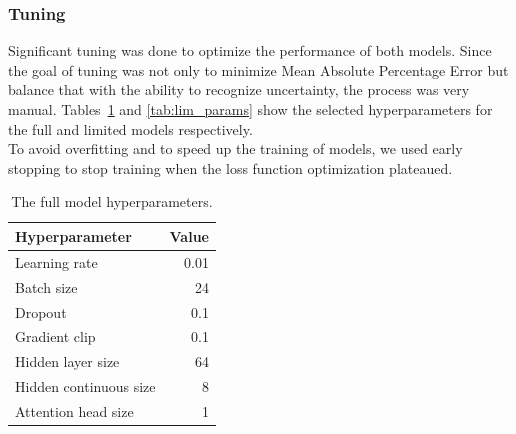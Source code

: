     \pagebreak
    \subsubsection{Tuning}
        Significant tuning was done to optimize the performance of both models. Since the goal of tuning was not only to minimize Mean Absolute Percentage Error but balance that with the ability to recognize uncertainty, the process was very manual. Tables~\ref{tab:full_params} and \ref{tab:lim_params} show the selected hyperparameters for the full and limited models respectively.\\
        
        To avoid overfitting and to speed up the training of models, we used early stopping to stop training when the loss function optimization plateaued. 
        
        \vspace{1.5cm}
    
        \begin{table}[ht!]
        \begin{center}
        \caption{The full model hyperparameters.
        \label{tab:full_params}}
        \vspace{0.5cm}
        \begin{tabular}{|l|r|}
        \hline
        \textbf{Hyperparameter} & \textbf{Value} \\ \hline
        Learning rate            & 0.01         \\ \hline
        Batch size              & 24            \\ \hline
        Dropout                 & 0.1            \\ \hline
        Gradient clip           & 0.1           \\ \hline
        Hidden layer size            & 64         \\ \hline
        Hidden continuous size & 8         \\ \hline
        Attention head size   & 1         \\ \hline
        \end{tabular}
        
        \end{center}
        \end{table}
        
